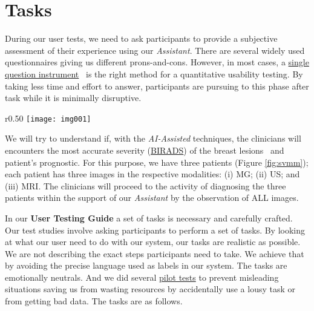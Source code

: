 
\section{Tasks}
\label{sec:sec007}

During our user tests, we need to ask participants to provide a subjective assessment of their experience using our \textit{Assistant}. There are several widely used questionnaires giving us different prons-and-cons. However, in most cases, a \hyperlink{https://www.nngroup.com/articles/keep-online-surveys-short/}{single question instrument}~\cite{sauro201210} is the right method for a quantitative usability testing. By taking less time and effort to answer, participants are pursuing to this phase after task while it is minimally disruptive.

\clearpage


\hfill

\begin{wrapfigure}{r}{0.50\textwidth}
\centering
\texttt{[image: img001]}
\caption{Diagram representing the use of the \textit{Assistant} by clinicians.}
\label{fig:svmm}
\end{wrapfigure}

\hfill


We will try to understand if, with the \textit{AI-Assisted} techniques, the clinicians will encounters the most accurate severity (\hyperlink{https://en.wikipedia.org/wiki/BI-RADS}{BIRADS}) of the breast lesions~\cite{american1998breast} and patient's prognostic. For this purpose, we have three patients (Figure \ref{fig:svmm}); each patient has three images in the respective modalities: (i) MG; (ii) US; and (iii) MRI. The clinicians will proceed to the activity of diagnosing the three patients within the support of our \textit{Assistant} by the observation of ALL images.

\hfill

In our \textbf{User Testing Guide} a set of tasks is necessary and carefully crafted. Our test studies involve asking participants to perform a set of tasks. By looking at what our user need to do with our system, our tasks are realistic as possible. We are not describing the exact steps participants need to take. We achieve that by avoiding the precise language used as labels in our system. The tasks are emotionally neutrals. And we did several \hyperlink{https://www.nngroup.com/articles/pilot-testing/}{pilot tests} to prevent misleading situations saving us from wasting resources by accidentally use a lousy task or from getting bad data. The tasks are as follows.


